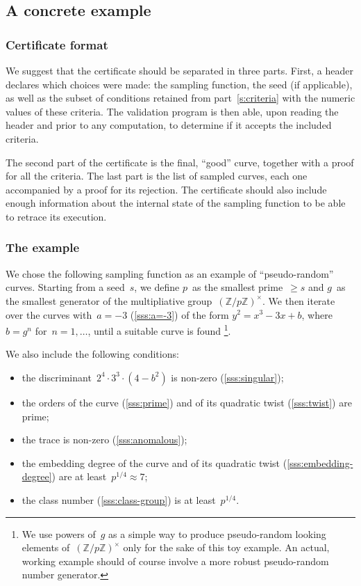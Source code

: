 \documentclass[twocolumn,letterpaper,10pt]{article}
\begin{document}
\subsection{A concrete example}

\subsubsection{Certificate format}

We suggest that the certificate should be separated in three parts.
First, a header declares which choices were made:
the sampling function, the seed (if applicable),
as well as the subset of conditions retained from part~\ref{s:criteria}
with the numeric values of these criteria.
The validation program is then able,
upon reading the header and prior to any computation,
to determine if it accepts the included criteria.

The second part of the certificate is the final, “good” curve,
together with a proof for all the criteria.
The last part is the list of sampled curves,
each one accompanied by a proof for its rejection.
The certificate should also include enough information about
the internal state of the sampling function
to be able to retrace its execution.

\subsubsection{The example}

We chose the following sampling function as an example
of “pseudo-random” curves.
Starting from a seed~$s$, we define $p$~as the smallest prime~$≥ s$
and $g$~as the smallest generator of the multipliative group~$(ℤ/pℤ)^{×}$.
We then iterate over the curves with~$a = -3$ (\ref{sss:a=-3})
of the form $y^2 = x^3 - 3 x + b$, where $b = g^n$ for~$n = 1, …$,
until a suitable curve is found%
\footnote{We use powers of~$g$ as a simple way to produce pseudo-random
looking elements of~$(ℤ/pℤ)^{×}$ only for the sake of this toy example.
An actual, working example should of course involve a more robust
pseudo-random number generator.}.

We also include the following conditions:
\begin{itemize} \itemsep 0pt \parskip 0pt
\item the discriminant~$2^4·3^3·(4-b^2)$ is non-zero
(\ref{sss:singular});
\item the orders of the curve (\ref{sss:prime}) and of its quadratic twist
(\ref{sss:twist}) are prime;
\item the trace is non-zero (\ref{sss:anomalous});
\item the embedding degree of the curve and of its quadratic twist
(\ref{sss:embedding-degree}) are at least~$p^{1/4} ≈ 7$;
\item the class number (\ref{sss:class-group}) is at least~$p^{1/4}$.
\end{itemize}
\end{document}
